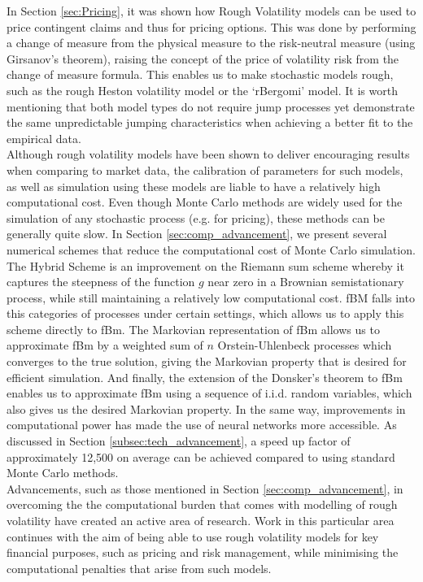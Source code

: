 \documentclass[12pt,oneside]{article}
\begin{document}
In Section \ref{sec:Pricing}, it was shown how Rough Volatility models can  be  used  to  price  contingent  claims  and  thus  for  pricing options. This was done by performing a change of measure from the physical measure to the risk-neutral measure (using Girsanov's theorem), raising the concept of the price of volatility risk from the change of measure formula. This enables us to make stochastic models rough, such as the rough Heston volatility model or the `rBergomi' model. It is worth mentioning that both model types do not require jump processes yet demonstrate the same unpredictable jumping characteristics when achieving a better fit to the empirical data.
\\

Although rough volatility models have been shown to deliver encouraging results when comparing to market data, the calibration of parameters for such models, as well as simulation using these models are liable to have a relatively high computational cost. Even though Monte Carlo methods are widely used for the simulation of any stochastic process (e.g. for pricing), these methods can be generally quite slow. In Section \ref{sec:comp_advancement}, we present several numerical schemes that reduce the computational cost of Monte Carlo simulation. The Hybrid Scheme is an improvement on the Riemann sum scheme whereby it captures the steepness of the function $g$ near zero in a Brownian semistationary process, while still maintaining a relatively low computational cost. fBM falls into this categories of processes under certain settings, which allows us to apply this scheme directly to fBm. The Markovian representation of fBm allows us to approximate fBm by a weighted sum of $n$ Orstein-Uhlenbeck processes which converges to the true solution, giving the Markovian property that is desired for efficient simulation. And finally, the extension of the Donsker's theorem to fBm enables us to approximate fBm using a sequence of i.i.d. random variables, which also gives us the desired Markovian property. In the same way, improvements in computational power has made the use of neural networks more accessible. As discussed in Section \ref{subsec:tech_advancement}, a speed up factor of approximately 12,500 on average can be achieved compared to using standard Monte Carlo methods.
\\

Advancements, such as those mentioned in Section \ref{sec:comp_advancement}, in overcoming the the computational burden that comes with modelling of rough volatility have created an active area of research. Work in this particular area continues with the aim of being able to use rough volatility models for key financial purposes, such as pricing and risk management, while minimising the computational penalties that arise from such models. 


% 

\end{document}
